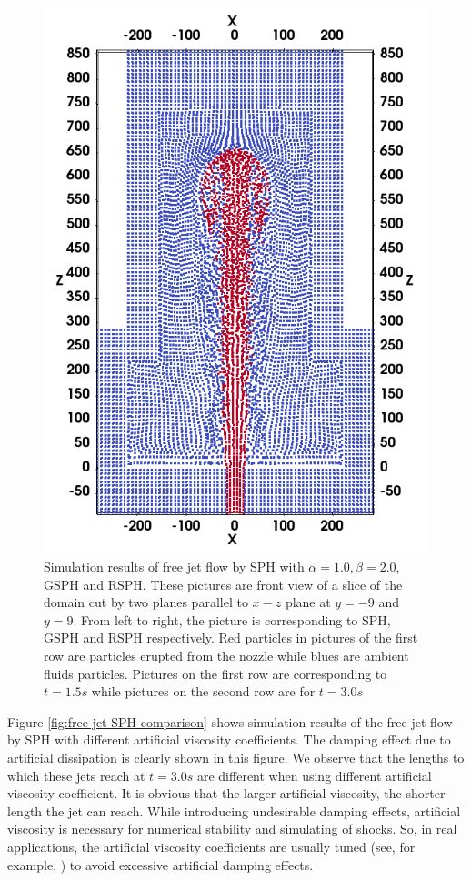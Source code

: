 \documentclass[review]{elsarticle}
\begin{document}
\begin{figure}[!ht]
\begin{minipage}[t]{.325\textwidth}
        \includegraphics[width=0.99 \textwidth]{./Figures/RSPH-t3-cutView}
    \end{minipage}%
    \caption{Simulation results of free jet flow by SPH with $\alpha=1.0, \beta=2.0$, GSPH and RSPH. These pictures are front view of a slice of the domain cut by two planes parallel to $x-z$ plane at $y=-9$ and $y=9$. From left to right, the picture is corresponding to SPH, GSPH and RSPH respectively. Red particles in pictures of the first row are particles erupted from the nozzle while blues are ambient fluids particles. Pictures on the first row are corresponding to $t=1.5s$ while pictures on the second row are for $t=3.0 s$}
    \label{fig:free-jet-comparison}
\end{figure}

Figure \ref{fig:free-jet-SPH-comparison} shows simulation results of the free jet flow by SPH with different artificial viscosity coefficients. The damping effect due to artificial dissipation is clearly shown in this figure. We observe that the lengths to which these jets reach at $t=3.0 s$ are different when using different artificial viscosity coefficient. It is obvious that the larger artificial viscosity, the shorter length the jet can reach. While introducing undesirable damping effects, artificial viscosity is necessary for numerical stability and simulating of shocks. So, in real applications, the artificial viscosity coefficients are usually tuned (see, for example, \citep{gmd-2017-119}) to avoid excessive artificial damping effects.
\end{document}
